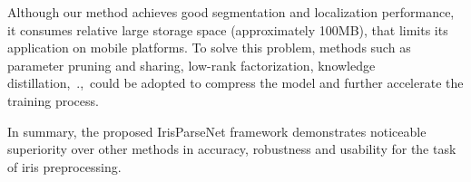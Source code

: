 \documentclass[journal]{IEEEtran}
\begin{document}
Although our method achieves good segmentation and localization performance, it consumes relative large storage space (approximately 100MB), that limits its application on mobile platforms. To solve this problem, methods such as parameter pruning and sharing, low-rank factorization, knowledge distillation\cite{cheng2017a},~\etc.,~could be adopted to compress the model and further accelerate the training process.

In summary, the proposed IrisParseNet framework demonstrates noticeable superiority over other methods in accuracy, robustness and usability for the task of iris preprocessing.
\begin{table}[!htb]
  \begin{center}
  \renewcommand{\arraystretch}{1.1}
  \setlength\tabcolsep{3pt}
  \caption{Comparison of Different Approaches on the Task of Iris Segmentation Using the Proposed Protocols.}\label{tab:seg}
\end{center}
\end{table}
\end{document}
